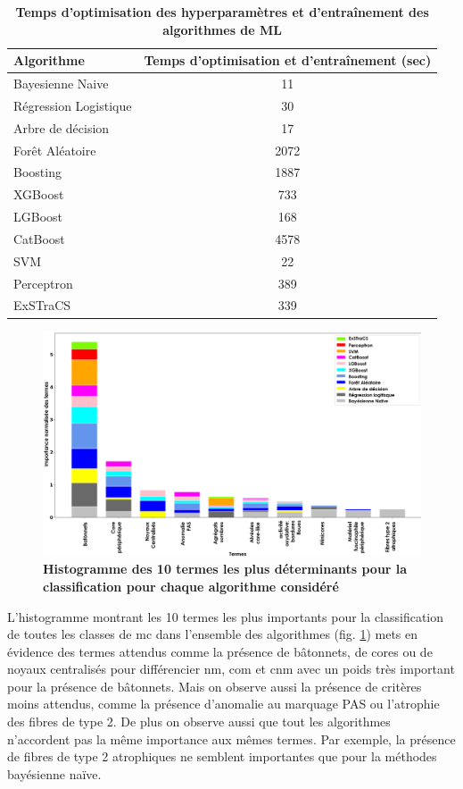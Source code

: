 \begin{table}[!ht]
    \centering
    \begin{tabular}{lc}
        \toprule
        Algorithme & Temps d'optimisation et d'entraînement (sec) \\
        \midrule
        Bayesienne Naive & 11 \\
        Régression Logistique & 30 \\
        Arbre de décision & 17 \\
        Forêt Aléatoire & 2072 \\
        Boosting & 1887 \\
        XGBoost & 733 \\
        LGBoost & 168 \\
        CatBoost & 4578 \\
        SVM & 22 \\
        Perceptron & 389 \\
        ExSTraCS & 339 \\
        \bottomrule
    \end{tabular}
    \caption[Temps d'optimisation des hyperparamètres et d'entraînement des algorithmes de ML]{\textbf{Temps d'optimisation des hyperparamètres et d'entraînement des algorithmes de ML}}
    \label{tab:pipeline_times}
\end{table}
\begin{figure}[!ht]
  \centering
  \includegraphics[width=1\textwidth]{figures/feature_importance.png}
  \caption[Histogramme des 10 termes les plus déterminants pour la classification]{\textbf{Histogramme des 10 termes les plus déterminants pour la classification pour chaque algorithme considéré}}
  \label{fig:feautre_importance}
\end{figure}
L'histogramme montrant les 10 termes les plus importants pour la classification de toutes les classes de \gls{mc} dans l'ensemble des algorithmes (fig. \ref{fig:feautre_importance}) mets en évidence des termes attendus comme la présence de bâtonnets, de cores ou de noyaux centralisés pour différencier \gls{nm}, \gls{com} et \gls{cnm} avec un poids très important pour la présence de bâtonnets. Mais on observe aussi la présence de critères moins attendus, comme la présence d'anomalie au marquage PAS ou l'atrophie des fibres de type 2. De plus on observe aussi que tout les algorithmes n'accordent pas la même importance aux mêmes termes. Par exemple, la présence de fibres de type 2 atrophiques ne semblent importantes que pour la méthodes bayésienne naïve.

